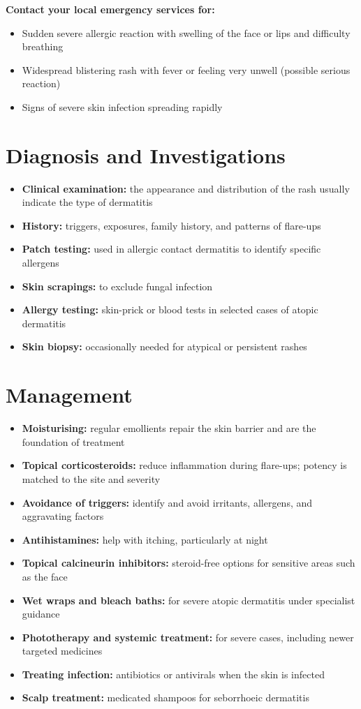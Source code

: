\textbf{Contact your local emergency services for:}
\begin{itemize}
    \item Sudden severe allergic reaction with swelling of the face or lips and difficulty breathing
    \item Widespread blistering rash with fever or feeling very unwell (possible serious reaction)
    \item Signs of severe skin infection spreading rapidly
\end{itemize}

\section*{Diagnosis and Investigations}
\begin{itemize}
    \item \textbf{Clinical examination:} the appearance and distribution of the rash usually indicate the type of dermatitis
    \item \textbf{History:} triggers, exposures, family history, and patterns of flare-ups
    \item \textbf{Patch testing:} used in allergic contact dermatitis to identify specific allergens
    \item \textbf{Skin scrapings:} to exclude fungal infection
    \item \textbf{Allergy testing:} skin-prick or blood tests in selected cases of atopic dermatitis
    \item \textbf{Skin biopsy:} occasionally needed for atypical or persistent rashes
\end{itemize}

\section*{Management}
\begin{itemize}
    \item \textbf{Moisturising:} regular emollients repair the skin barrier and are the foundation of treatment
    \item \textbf{Topical corticosteroids:} reduce inflammation during flare-ups; potency is matched to the site and severity
    \item \textbf{Avoidance of triggers:} identify and avoid irritants, allergens, and aggravating factors
    \item \textbf{Antihistamines:} help with itching, particularly at night
    \item \textbf{Topical calcineurin inhibitors:} steroid-free options for sensitive areas such as the face
    \item \textbf{Wet wraps and bleach baths:} for severe atopic dermatitis under specialist guidance
    \item \textbf{Phototherapy and systemic treatment:} for severe cases, including newer targeted medicines
    \item \textbf{Treating infection:} antibiotics or antivirals when the skin is infected
    \item \textbf{Scalp treatment:} medicated shampoos for seborrhoeic dermatitis
\end{itemize}

